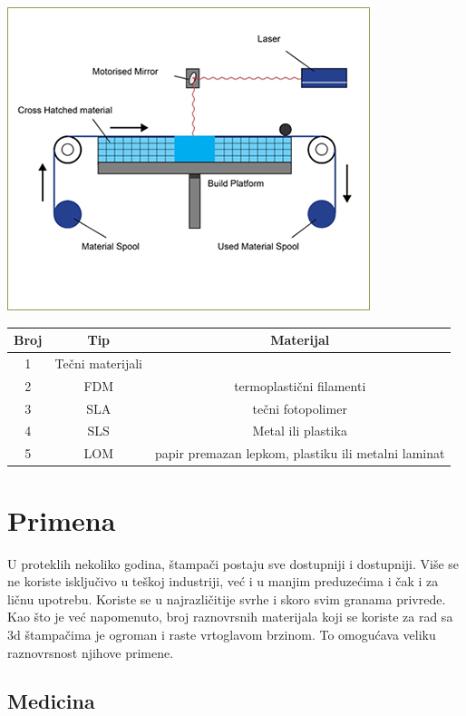 \documentclass[a4paper]{article}
\begin{document}
{\begin{center}
\includegraphics[width=.5\textwidth ]{Tehnikeslike/LOM.jpg}
\end{center}

\begin{center}
\begin{tabular}{||c c c ||} 
 \hline
 Broj & Tip  & Materijal \\ [1ex] 
 \hline\hline
 1 & Tečni materijali \\ 
 \hline
 2 & FDM & termoplastični filamenti \\
 \hline
 3 & SLA & tečni fotopolimer\\
 \hline
 4 & SLS & Metal ili plastika\\
 \hline
 5 & LOM & papir premazan lepkom, plastiku ili metalni laminat\\ [1ex] 
 \hline
\end{tabular}
\end{center}

\newpage

\section{Primena}
\label{sec:Primena}

U proteklih nekoliko godina, štampači postaju sve dostupniji i dostupniji. Više se ne koriste isključivo u teškoj industriji, već i u manjim preduzećima i čak i za ličnu upotrebu. Koriste se u najrazličitije svrhe i skoro svim granama privrede. Kao što je već napomenuto, broj raznovrsnih materijala koji se koriste za rad sa 3d štampačima je ogroman i raste vrtoglavom brzinom. To omogućava veliku raznovrsnost njihove primene. 

\subsection{Medicina}
\label{subsec:podnaslov6}

}
\end{document}
